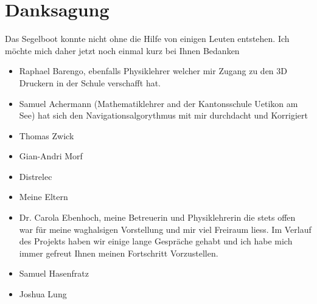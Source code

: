 

\chapter{Danksagung}
\label{chap:danksagung}
Das Segelboot konnte nicht ohne die Hilfe von einigen Leuten entstehen. Ich möchte mich daher jetzt noch einmal kurz bei Ihnen Bedanken
\begin{itemize}

  \item Raphael Barengo, ebenfalls Physiklehrer welcher mir Zugang zu den 3D Druckern in der Schule verschafft hat.
  \item Samuel Achermann (Mathematiklehrer and der Kantonsschule Uetikon am See) hat sich den Navigationsalgorythmus mit mir durchdacht und Korrigiert
  \item Thomas Zwick
  \item Gian-Andri Morf
  \item Distrelec
  \item Meine Eltern
    \item Dr. Carola Ebenhoch, meine Betreuerin und Physiklehrerin die stets offen war für meine waghalsigen Vorstellung und mir viel Freiraum liess. Im Verlauf des Projekts haben wir einige lange Gespräche gehabt und ich habe mich immer gefreut Ihnen meinen Fortschritt Vorzustellen.
    \item Samuel Hasenfratz
 \item Joshua Lung
 
\end{itemize}
